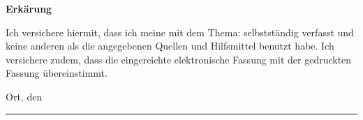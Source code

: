 
%


{\Large \textbf{Erkärung}}
\makeatletter

Ich versichere hiermit, dass ich meine {\@title} mit dem Thema: {\projectname} selbstständig verfasst und keine anderen als die angegebenen Quellen und Hilfsmittel benutzt habe. Ich versichere zudem, dass die eingereichte elektronische Fassung mit der gedruckten Fassung übereinstimmt.

\vspace{1cm}

Ort, den {\@date}

\vspace{2.5cm}

\rule{5cm}{0.4pt}

\@author

\makeatother